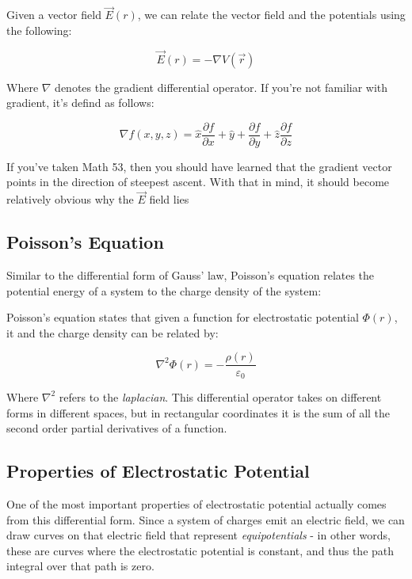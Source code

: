 \documentclass{report}
\theoremstyle{definition}
\numberwithin{equation}{section}
\numberwithin{definition}{section}
\begin{document}
    \begin{theorem}
        Given a vector field $\vec{E}(r)$, we can relate the vector field and the potentials using the following:

        \[ \vec{E}(r) = -\nabla V(\vec{r})\]
    \end{theorem}

    Where $\nabla$ denotes the gradient differential operator. If you're not familiar with gradient, it's defind as follows:

    \[ \nabla f(x, y, z) = \hat x \frac{\partial f}{\partial x} + \hat y + \frac{\partial f}{\partial y} + \hat z \frac{\partial f}{\partial z}\]

    If you've taken Math 53, then you should have learned that the gradient vector points in the direction of steepest ascent. With that in mind, it should become relatively obvious why the $\vec{E}$ field lies 


    \subsection{Poisson's Equation}

    Similar to the differential form of Gauss' law, Poisson's equation relates the potential energy of a system to the charge density of the system:

    \begin{theorem}
        Poisson's equation states that given a function for electrostatic potential $\Phi(r)$, it and the charge density can be related by:

        \[ \nabla^2 \Phi(r) = -\frac{\rho(r)}{\varepsilon_0}\] 

        Where $\nabla^2$ refers to the \textit{laplacian}. This differential operator takes on different forms in different spaces, but in rectangular coordinates it is the sum of all the second order partial derivatives of a function.
    \end{theorem}

    \subsection{Properties of Electrostatic Potential}

    One of the most important properties of electrostatic potential actually comes from this differential form. Since a system of charges emit an electric field, we can draw curves on that electric field that represent \textit{equipotentials} - in other words, these are curves where the electrostatic potential is constant, and thus the path integral over that path is zero.
\end{document}
